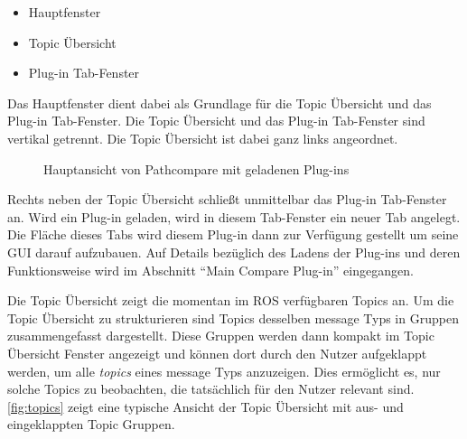 \begin{itemize}
\item Hauptfenster
\item Topic Übersicht
\item Plug-in Tab-Fenster
\end{itemize}

Das Hauptfenster dient dabei als Grundlage für die Topic Übersicht und das
Plug-in Tab-Fenster. Die Topic Übersicht und das Plug-in Tab-Fenster sind vertikal
getrennt. Die Topic Übersicht ist dabei ganz links angeordnet.

\begin{figure}[t]
  \begin{center}
  \end{center}
  \caption{Hauptansicht von Pathcompare mit geladenen Plug-ins}
  \label{fig:pathcompare}
\end{figure}

Rechts neben der Topic Übersicht schließt unmittelbar das Plug-in Tab-Fenster
an. Wird ein Plug-in geladen, wird in diesem Tab-Fenster ein neuer Tab
angelegt. Die Fläche dieses Tabs wird diesem Plug-in dann zur Verfügung
gestellt um seine GUI darauf aufzubauen. Auf Details bezüglich des Ladens der
Plug-ins und deren Funktionsweise wird im Abschnitt ``Main
Compare Plug-in'' eingegangen. 

Die Topic Übersicht zeigt die momentan im ROS verfügbaren Topics an.  Um die
Topic Übersicht zu strukturieren sind Topics desselben message Typs in Gruppen
zusammengefasst dargestellt.  Diese Gruppen werden dann kompakt im Topic
Übersicht Fenster angezeigt und können dort durch den Nutzer aufgeklappt
werden, um alle \textit{topics} eines message Typs anzuzeigen. Dies ermöglicht
es, nur solche Topics zu beobachten, die tatsächlich für den Nutzer relevant
sind. \autoref{fig:topics} zeigt eine typische Ansicht der Topic Übersicht mit
aus- und eingeklappten Topic Gruppen.

